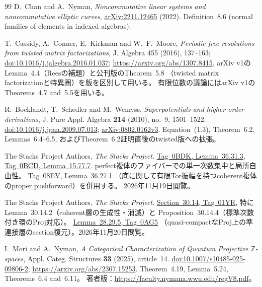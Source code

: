 \documentclass[11pt,a4paper]{ltjsarticle}
\numberwithin{equation}{section}
\begin{document}
\begin{thebibliography}{99}
D.~Chan and A.~Nyman,
\emph{Noncommutative linear systems and noncommutative elliptic curves},
\href{https://arxiv.org/abs/2211.12465}{arXiv:2211.12465} (2022).
Definition~8.6 (normal families of elements in indexed algebras).

T.~Cassidy, A.~Conner, E.~Kirkman and W.~F.~Moore,
\emph{Periodic free resolutions from twisted matrix factorizations},
J. Algebra 455 (2016), 137--163;
\href{https://doi.org/10.1016/j.jalgebra.2016.01.037}{doi:10.1016/j.jalgebra.2016.01.037};
\url{https://arxiv.org/abs/1307.8415}.
arXiv v1のLemma~4.4（Reesの補題）と公刊版のTheorem~5.8
（twisted matrix factorizationと特異圏）を版を区別して用いる。
有限位数の議論にはarXiv v1のTheorems~4.7 and~5.5を用いる。

R.~Bocklandt, T.~Schedler and M.~Wemyss,
\emph{Superpotentials and higher order derivations},
J. Pure Appl. Algebra \textbf{214} (2010), no.~9, 1501--1522.
\href{https://doi.org/10.1016/j.jpaa.2009.07.013}{doi:10.1016/j.jpaa.2009.07.013};
\href{https://arxiv.org/abs/0802.0162v3}{arXiv:0802.0162v3}.
Equation~(1.3), Theorem~6.2, Lemmas~6.4--6.5,
およびTheorem~6.2証明直後のtwisted版への拡張。

The Stacks Project Authors, \emph{The Stacks Project}.
\href{https://stacks.math.columbia.edu/tag/0BDK}{Tag~0BDK, Lemma~36.31.3},
\href{https://stacks.math.columbia.edu/tag/0BCD}{Tag~0BCD, Lemma~15.77.7}.
perfect複体のファイバーでの単一次数集中と局所自由性。
\href{https://stacks.math.columbia.edu/tag/08EV}{Tag~08EV, Lemma~36.27.1}
（底に関して有限Tor振幅を持つcoherent複体のproper pushforward）を併用する。
2026年11月19日閲覧。

The Stacks Project Authors, \emph{The Stacks Project}.
\href{https://stacks.math.columbia.edu/tag/01YR}{Section~30.14, Tag~01YR},
特にLemma~30.14.2（coherent層の生成性・消滅）と
Proposition~30.14.4（標準次数付き環のProj対応）。
\href{https://stacks.math.columbia.edu/tag/0AG5}{Lemma~28.29.5, Tag~0AG5}
（quasi-compactなProj上の準連接層のsection復元）。2026年11月20日閲覧。

I.~Mori and A.~Nyman,
\emph{A Categorical Characterization of Quantum Projective $\mathbb Z$-spaces},
Appl. Categ. Structures \textbf{33} (2025), article~14.
\href{https://doi.org/10.1007/s10485-025-09806-2}{doi:10.1007/s10485-025-09806-2};
\url{https://arxiv.org/abs/2307.15253}.
Theorem~4.19, Lemma~5.24, Theorems~6.4 and~6.11。
著者版：\url{https://faculty.nymana.wwu.edu/regV8.pdf}。


\end{thebibliography}
\end{document}
